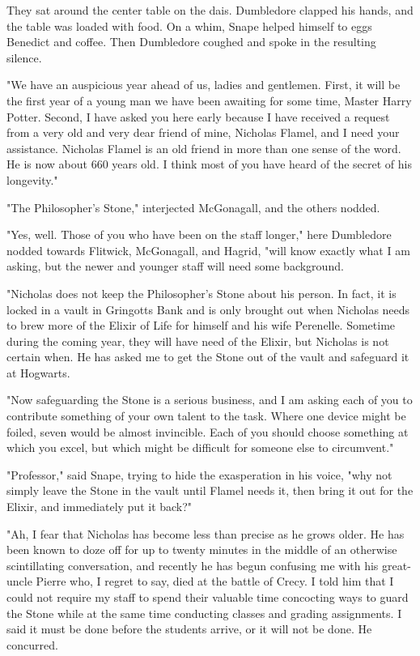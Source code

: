 \documentclass[a4paper,11pt]{article}
\begin{document}
They sat around the center table on the dais. Dumbledore clapped his hands, and the table was loaded with food. On a whim, Snape helped himself to eggs Benedict and coffee. Then Dumbledore coughed and spoke in the resulting silence.

"We have an auspicious year ahead of us, ladies and gentlemen. First, it will be the first year of a young man we have been awaiting for some time, Master Harry Potter. Second, I have asked you here early because I have received a request from a very old and very dear friend of mine, Nicholas Flamel, and I need your assistance. Nicholas Flamel is an old friend in more than one sense of the word. He is now about 660 years old. I think most of you have heard of the secret of his longevity."

"The Philosopher's Stone," interjected McGonagall, and the others nodded.

"Yes, well. Those of you who have been on the staff longer," here Dumbledore nodded towards Flitwick, McGonagall, and Hagrid, "will know exactly what I am asking, but the newer and younger staff will need some background.

"Nicholas does not keep the Philosopher's Stone about his person. In fact, it is locked in a vault in Gringotts Bank and is only brought out when Nicholas needs to brew more of the Elixir of Life for himself and his wife Perenelle. Sometime during the coming year, they will have need of the Elixir, but Nicholas is not certain when. He has asked me to get the Stone out of the vault and safeguard it at Hogwarts.

"Now safeguarding the Stone is a serious business, and I am asking each of you to contribute something of your own talent to the task. Where one device might be foiled, seven would be almost invincible. Each of you should choose something at which you excel, but which might be difficult for someone else to circumvent."

"Professor," said Snape, trying to hide the exasperation in his voice, "why not simply leave the Stone in the vault until Flamel needs it, then bring it out for the Elixir, and immediately put it back?"

"Ah, I fear that Nicholas has become less than precise as he grows older. He has been known to doze off for up to twenty minutes in the middle of an otherwise scintillating conversation, and recently he has begun confusing me with his great-uncle Pierre who, I regret to say, died at the battle of Crecy. I told him that I could not require my staff to spend their valuable time concocting ways to guard the Stone while at the same time conducting classes and grading assignments. I said it must be done before the students arrive, or it will not be done. He concurred.
\end{document}
